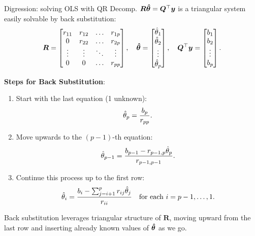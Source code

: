 \documentclass[11pt,compress,t,notes=noshow, xcolor=table]{beamer}
\begin{document}
\begin{vbframe}{Digression: solving OLS with QR Decomp.}
$\bm{R} \bm{\hat{\theta}} = \bm{Q}^{\top} \bm{y}$ is a triangular system easily solvable by back substitution:
\[
\bm{R} = \begin{bmatrix} 
r_{11} & r_{12} & \dots & r_{1p} \\ 
0 & r_{22} & \dots & r_{2p} \\ 
\vdots & \vdots & \ddots & \vdots \\ 
0 & 0 & \dots & r_{pp} 
\end{bmatrix}, \quad 
\bm{\hat{\theta}} = \begin{bmatrix} 
\hat{\theta}_1 \\ 
\hat{\theta}_2 \\ 
\vdots \\ 
\hat{\theta}_p 
\end{bmatrix}, \quad \bm{Q}^{\top} \bm{y} = \begin{bmatrix} 
b_1 \\ 
b_2 \\ 
\vdots \\ 
b_p 
\end{bmatrix}.
\]

\pagebreak

\textbf{Steps for Back Substitution}:
\begin{enumerate}
    \item Start with the last equation (1 unknown):
          \[
          \hat{\theta}_p = \frac{b_p}{r_{pp}}.
          \]
    \item Move upwards to the \( (p-1) \)-th equation:
          \[
          \hat{\theta}_{p-1} = \frac{b_{p-1} - r_{p-1,p} \hat{\theta}_p}{r_{p-1,p-1}}.
          \]
    \item Continue this process up to the first row:
          \[
          \hat{\theta}_i = \frac{b_i - \sum_{j=i+1}^p r_{ij} \hat{\theta}_j}{r_{ii}} \quad \text{for each } i = p-1, \dots, 1.
          \]
\end{enumerate}

Back substitution leverages triangular structure of $\bm{R}$, moving upward from the last row and inserting already known values of $\bm{\hat{\theta}}$ as we go.

\end{vbframe}


\end{document}
